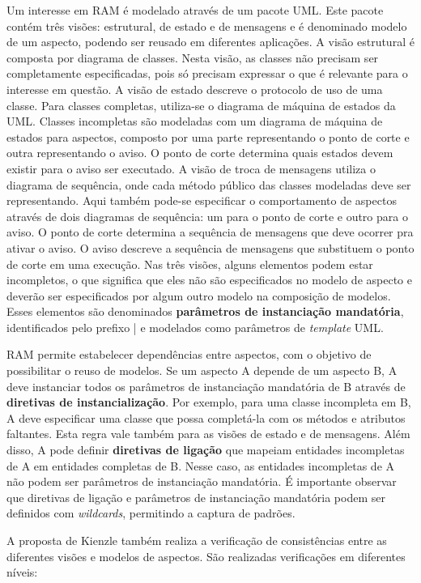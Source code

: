 Um interesse em RAM é modelado através de um pacote UML. Este pacote contém três visões: estrutural, de estado e de mensagens e é denominado modelo de
um aspecto, podendo ser reusado em diferentes aplicações. A visão estrutural é composta por diagrama de classes. Nesta visão, as classes não precisam
ser completamente especificadas, pois só precisam expressar o que é relevante para o interesse em questão. A visão de estado descreve o protocolo de
uso de uma classe. Para classes completas, utiliza-se o diagrama de máquina de estados da UML. Classes incompletas são modeladas com um diagrama de
máquina de estados para aspectos, composto por uma parte representando o ponto de corte e outra representando o aviso. O ponto de corte determina
quais estados devem existir para o aviso ser executado. A visão de troca de mensagens utiliza o diagrama de sequência, onde cada método público das
classes modeladas deve ser representando. Aqui também pode-se especificar o comportamento de aspectos através de dois diagramas de sequência:
um para o ponto de corte e outro para o aviso. O ponto de corte determina a sequência de mensagens que deve ocorrer pra ativar o aviso. O aviso
descreve a sequência de mensagens que substituem o ponto de corte em uma execução. Nas três visões, alguns elementos podem estar incompletos, o que
significa que eles não são especificados no modelo de aspecto e deverão ser especificados por algum outro modelo na composição de modelos. Esses
elementos são denominados \textbf{parâmetros de instanciação mandatória}, identificados pelo prefixo | e modelados como parâmetros de
\textit{template} UML.

RAM permite estabelecer dependências entre aspectos, com o objetivo de possibilitar o reuso de modelos. Se um aspecto A depende de um aspecto B, A
deve instanciar todos os parâmetros de instanciação mandatória de B através de \textbf{diretivas de instancialização}. Por exemplo, para uma
classe incompleta em B, A deve especificar uma classe que possa completá-la com os métodos e atributos faltantes. Esta regra vale também para as visões de
estado e de mensagens. Além disso, A pode definir \textbf{diretivas de ligação} que mapeiam entidades incompletas de A em entidades completas de B.
Nesse caso, as entidades incompletas de A não podem ser parâmetros de instanciação mandatória. É importante observar que diretivas de ligação e
parâmetros de instanciação mandatória podem ser definidos com \textit{wildcards}, permitindo a captura de padrões.

A proposta de Kienzle também realiza a verificação de consistências entre as diferentes visões e modelos de aspectos. São realizadas verificações em
diferentes níveis:

